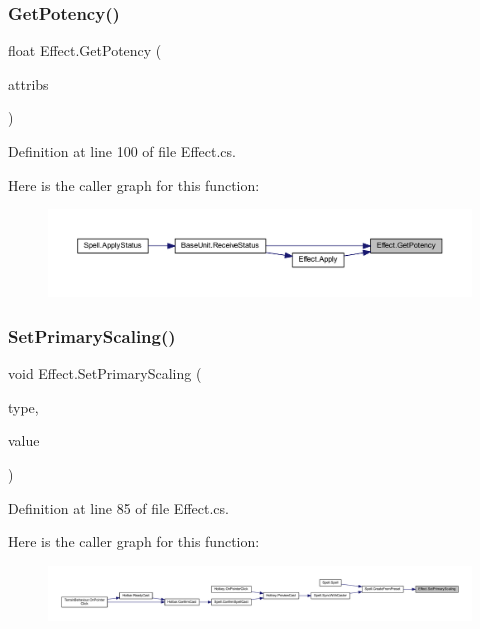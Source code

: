 \subsubsection{\texorpdfstring{GetPotency()}{GetPotency()}}
{\footnotesize\ttfamily float Effect.\+Get\+Potency (\begin{DoxyParamCaption}\item[{\mbox{\hyperlink{class_attributes}{Attributes}}}]{attribs }\end{DoxyParamCaption})}



Definition at line 100 of file Effect.\+cs.

Here is the caller graph for this function\+:
\nopagebreak
\begin{figure}[H]
\begin{center}
\leavevmode
\includegraphics[width=350pt]{class_effect_a5af13ce8f65df2bfbba422a46e627fc0_icgraph}
\end{center}
\end{figure}
\mbox{\label{class_effect_a5c751c4432cf967c74fe16befbdbbe2e}} 
\subsubsection{\texorpdfstring{SetPrimaryScaling()}{SetPrimaryScaling()}}
{\footnotesize\ttfamily void Effect.\+Set\+Primary\+Scaling (\begin{DoxyParamCaption}\item[{\mbox{\hyperlink{class_effect_af0ada789de40f58c24c46bf8ed2f300c}{Scaling\+Type}}}]{type,  }\item[{float}]{value }\end{DoxyParamCaption})}



Definition at line 85 of file Effect.\+cs.

Here is the caller graph for this function\+:
\nopagebreak
\begin{figure}[H]
\begin{center}
\leavevmode
\includegraphics[width=350pt]{class_effect_a5c751c4432cf967c74fe16befbdbbe2e_icgraph}
\end{center}
\end{figure}
\mbox{\label{class_effect_a476b569a5adf97f1b691dcbb7e5cb325}} 
